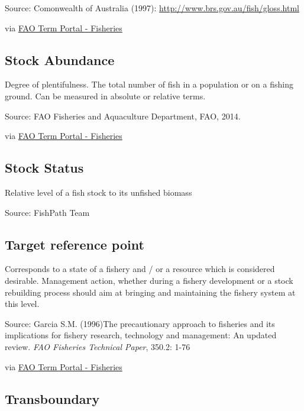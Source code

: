 \documentclass[
  11pt,
]{book}
\begin{document}
Source: Comonwealth of Australia (1997): \url{http://www.brs.gov.au/fish/gloss.html}

via \href{http://www.fao.org/fishery/glossary/en}{FAO Term Portal - Fisheries}

\hypertarget{stock-abundance}{%
\subsection{Stock Abundance}\label{stock-abundance}}

Degree of plentifulness. The total number of fish in a population or on a fishing ground. Can be measured in absolute or relative terms.

Source: FAO Fisheries and Aquaculture Department, FAO, 2014.

via \href{http://www.fao.org/fishery/glossary/en}{FAO Term Portal - Fisheries}

\hypertarget{stock-status}{%
\subsection{Stock Status}\label{stock-status}}

Relative level of a fish stock to its unfished biomass

Source: FishPath Team

\hypertarget{target-reference-point}{%
\subsection{Target reference point}\label{target-reference-point}}

Corresponds to a state of a fishery and / or a resource which is considered desirable. Management action, whether during a fishery development or a stock rebuilding process should aim at bringing and maintaining the fishery system at this level.

Source: Garcia S.M. (1996)The precautionary approach to fisheries and its implications for fishery research, technology and management: An updated review. \emph{FAO Fisheries Technical Paper}, 350.2: 1-76

via \href{http://www.fao.org/fishery/glossary/en}{FAO Term Portal - Fisheries}

\hypertarget{transboundary}{%
\subsection{Transboundary}\label{transboundary}}
\end{document}
